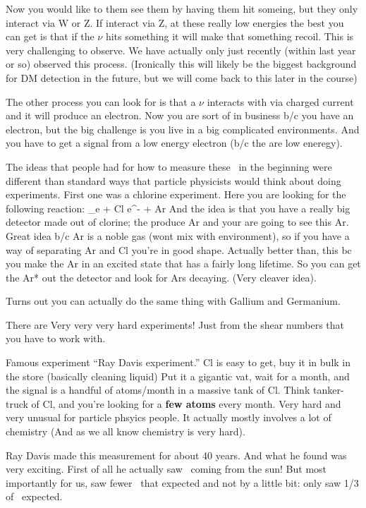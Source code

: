 {Now you would like to them see them by having them hit someing, but they only interact via W or Z. 
If interact via Z, at these really low energies the best you can get is that if the $\nu$ hits something it will make that something recoil. 
This is very challenging to observe.  
We have actually only just recently (within last year or so) observed this process. 
(Ironically this will likely be the biggest background for DM detection in the future, but we will come back to this later in the course) 

The other process you can look for is that a $\nu$ interacts with via charged current and it will produce an electron. 
Now you are sort of in business b/c you have an electron, but the big challenge is you live in a big complicated environments.
And you have to get a signal from a low energy electron (b/c the \nus are low eneregy).

The ideas that people had for how to measure these \nus\ in the beginning were different than standard ways that particle physicists would think about doing experiments. 
First one was a chlorine experiment.  
Here you are looking for the following reaction:
\be
\nu_e + Cl \rightarrow e^- + Ar
\ee
And the idea is that you have a really big detector made out of clorine; the \nus produce Ar and your are going to see this Ar. 
Great idea b/c Ar is a noble gas (wont mix with environment), so if you have a way of separating Ar and Cl you're in good shape. 
Actually better than, this bc you make the Ar in an excited state that has a fairly long lifetime. 
So you can get the Ar* out the detector and look for Ars decaying. (Very cleaver idea). 

Turns out you can actually do the same thing with Gallium and Germanium. 

There are Very very very hard experiments!
Just from the shear numbers that you have to work with. 

Famous experiment ``Ray Davis experiment.''
Cl is easy to get, buy it in bulk in the store (basically cleaning liquid)
Put it a gigantic vat, wait for a month, and the signal is a handful of atoms/month in a massive tank of Cl. 
Think tanker-truck of Cl, and you're looking for a \textbf{few atoms} every month.
Very hard and very unusual for particle phsyics people.
It actually mostly involves a lot of chemistry (And as we all know chemistry is very hard).

Ray Davis made this measurement for about 40 years. 
And what he found was very exciting. 
First of all he actually saw \nus\ coming from the sun!
But most importantly for us, saw fewer \nus\ that expected and not by a little bit: only saw 1/3 of \nus\ expected. 

}
